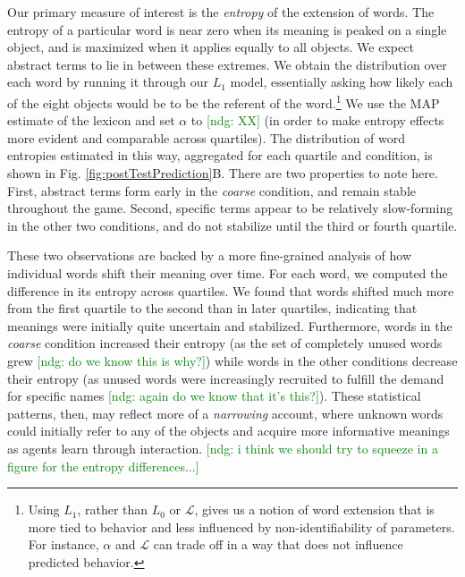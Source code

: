 \documentclass[10pt,letterpaper]{article}
\newcommand{\ndg}[1]{\textcolor{Green}{[ndg: #1]}}
\begin{document}
Our primary measure of interest is the \emph{entropy} of the extension of words. The entropy of a particular word is near zero when its meaning is peaked on a single object, and is maximized when it applies equally to all objects. 
We expect abstract terms to lie in between these extremes. 
We obtain the distribution over each word by running it through our $L_1$ model, essentially asking how likely each of the eight objects would be to be the referent of the word.\footnote{Using $L_1$, rather than $L_0$ or $\mathcal{L}$, gives us a notion of word extension that is more tied to behavior and less influenced by non-identifiability of parameters. For instance, $\alpha$ and $\mathcal{L}$ can trade off in a way that does not influence predicted behavior.} 
We use the MAP estimate of the lexicon and set $\alpha$ to \ndg{XX} (in order to make entropy effects more evident and comparable across quartiles). 
The distribution of word entropies estimated in this way, aggregated for each quartile and condition, is shown in Fig. \ref{fig:postTestPrediction}B. There are two properties to note here. First, abstract terms form early in the \emph{coarse} condition, and remain stable throughout the game. Second, specific terms appear to be relatively slow-forming in the other two conditions, and do not stabilize until the third or fourth quartile. 

These two observations are backed by a more fine-grained analysis of how individual words shift their meaning over time. For each word, we computed the difference in its entropy across quartiles. We found that words shifted much more from the first quartile to the second than in later quartiles, indicating that meanings were initially quite uncertain and stabilized. Furthermore, words in the \emph{coarse} condition increased their entropy (as the set of completely unused words grew \ndg{do we know this is why?}) while words in the other conditions decrease their entropy (as unused words were increasingly recruited to fulfill the demand for specific names \ndg{again do we know that it's this?}). These statistical patterns, then, may reflect more of a \emph{narrowing} account, where unknown words could initially refer to any of the objects and acquire more informative meanings as agents learn through interaction.
\ndg{i think we should try to squeeze in a figure for the entropy differences...}
\end{document}
